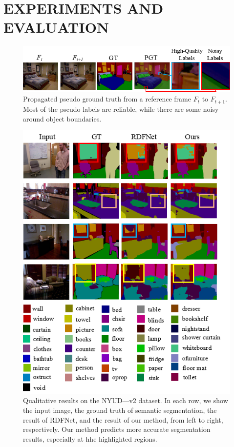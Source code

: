 \section{EXPERIMENTS AND EVALUATION}
\label{sec:exper}

\begin{figure}[t]
	\centering
	\includegraphics[width=\columnwidth]{figure/PGT.png}
	\caption{Propagated pseudo ground truth from a reference frame $F_t$ to $F_{t+1}$. Most of the pseudo labels are reliable, while there are some noisy around object boundaries.}
	\label{fig:PGT}
\end{figure}

\begin{figure}[!th]
	\centering
	\includegraphics[width=\columnwidth]{figure/Result.png}
	\caption{Qualitative results on the NYUD—v2 dataset. In each row, we show the input image, the ground truth of semantic segmentation, the result of RDFNet, and the result of our method, from left to right, respectively. Our method predicts more accurate segmentation results, especially at hhe highlighted regions.}
	\label{fig:VisResult}
\end{figure}

